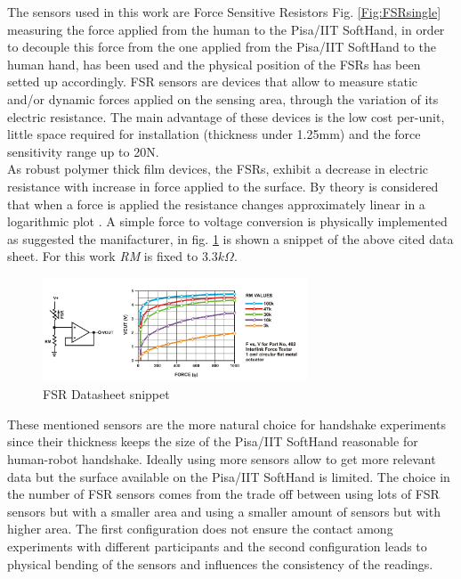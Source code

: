 The sensors used in this work are Force Sensitive Resistors Fig. \ref{Fig:FSRsingle} measuring the force applied from the human to the Pisa/IIT SoftHand, in order to decouple this force from the one applied from the Pisa/IIT SoftHand to the human hand, \cite{espen} has been used and the physical position of the FSRs has been setted up accordingly.
FSR sensors are devices that allow to measure static and/or dynamic forces applied on the sensing area, through the variation of its electric resistance. The main advantage of these devices is the low cost per-unit, little space required for installation (thickness under 1.25mm) and the force sensitivity range up to 20N.\\
As robust polymer thick film devices, the FSRs, exhibit a decrease in electric resistance with increase in force applied to the surface. By theory is considered that when a force is applied the resistance changes approximately linear in a logarithmic plot \cite{fsrdatasheet}.
A simple force to voltage conversion is physically implemented as suggested the manifacturer, in fig. \ref{Fig:FSRcircuit} is shown a snippet of the above cited data sheet. For this work \textit{RM} is fixed to $3.3 k \Omega $. 
\begin{figure}[ht]
\centering
\includegraphics[width=0.7\textwidth]{Figure/fsr.png}
\caption{FSR Datasheet snippet}
\label{Fig:FSRcircuit}
\end{figure}
These mentioned sensors are the more natural choice for handshake experiments since their thickness keeps the size of the Pisa/IIT SoftHand reasonable for human-robot handshake.
% 
Ideally using more sensors allow to get more relevant data but the surface available on the Pisa/IIT SoftHand is limited. The choice in the number of FSR sensors comes from the trade off between using lots of FSR sensors but with a smaller area and using a smaller amount of sensors but with higher area. The first configuration does not ensure the contact among experiments with different participants and the second configuration leads to physical bending of the sensors and influences the consistency of the readings.


